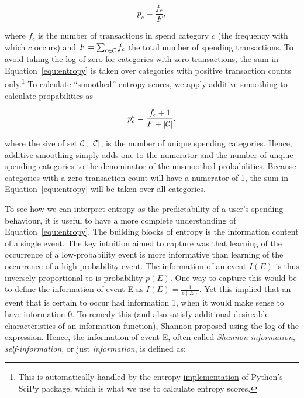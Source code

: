 \begin{equation}
    p_c = \frac{f_c}{F},
\end{equation}

\noindent where $f_c$ is the number of transactions in spend category $c$ (the
frequency with which $c$ occurs) and $F = \sum_{c \in \mathcal{C}}f_c$ the total
number of spending transactions. To avoid taking the log of zero for categories
with zero transactions, the sum in Equation~\ref{equ:entropy} is taken over
categories with positive transaction counts only.\footnote{This is
    automatically handled by the entropy
    \href{https://docs.scipy.org/doc/scipy/reference/generated/scipy.stats.entropy.html}{implementation}
of Python's SciPy package, which is what we use to calculate entropy scores.}
To calculate ``smoothed'' entropy scores, we apply additive smoothing to
calculate propabilities as

\begin{equation}
    \label{equ:prob_s}
    p_c^{s} = \frac{f_c + 1}{F + |\mathcal{C}|},
\end{equation}

\noindent where the size of set $\mathcal{C}$, $|\mathcal{C}|$, is the number of unique
spending categories. Hence, additive smoothing simply adds one to the numerator
and the number of unqiue spending categories to the denominator of the
unsmoothed probabilities. Because categories with a zero transaction count will
have a numerator of 1, the sum in Equation~\ref{equ:entropy} will be taken over
all categories.

To see how we can interpret entropy as the predictability of a user's spending
behaviour, it is useful to have a more complete understanding of
Equation~\ref{equ:entropy}. The building blocks of entropy is the information
content of a single event. The key intuition \citet{shannon1948mathematical}
aimed to capture was that learning of the occurrence of a low-probability event
is more informative than learning of the occurrence of a high-probability
event. The information of an event $I(E)$ is thus inversely proportional to is
probability $p(E)$. One way to capture this would be to define the information
of event E as $I(E) = \frac{1}{p(E)}$. Yet this implied that an event that is
certain to occur had information 1, when it would make sense to have
information 0. To remedy this (and also satisfy additional desireable
characteristics of an information function), Shannon proposed using the log of
the expression. Hence, the information of event E, often called \textit{Shannon
information}, \textit{self-information}, or just \textit{information}, is
defined as:

